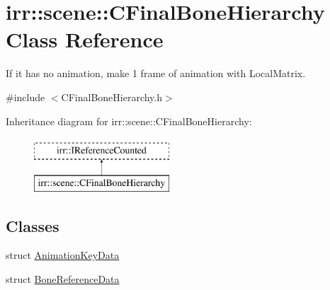 \hypertarget{classirr_1_1scene_1_1CFinalBoneHierarchy}{}\section{irr\+:\+:scene\+:\+:C\+Final\+Bone\+Hierarchy Class Reference}
\label{classirr_1_1scene_1_1CFinalBoneHierarchy}


If it has no animation, make 1 frame of animation with Local\+Matrix.  




{\ttfamily \#include $<$C\+Final\+Bone\+Hierarchy.\+h$>$}

Inheritance diagram for irr\+:\+:scene\+:\+:C\+Final\+Bone\+Hierarchy\+:\begin{figure}[H]
\begin{center}
\leavevmode
\includegraphics[height=2.000000cm]{classirr_1_1scene_1_1CFinalBoneHierarchy}
\end{center}
\end{figure}
\subsection*{Classes}
\begin{DoxyCompactItemize}
\item 
struct \hyperlink{structirr_1_1scene_1_1CFinalBoneHierarchy_1_1AnimationKeyData}{Animation\+Key\+Data}
\item 
struct \hyperlink{structirr_1_1scene_1_1CFinalBoneHierarchy_1_1BoneReferenceData}{Bone\+Reference\+Data}
\end{DoxyCompactItemize}
